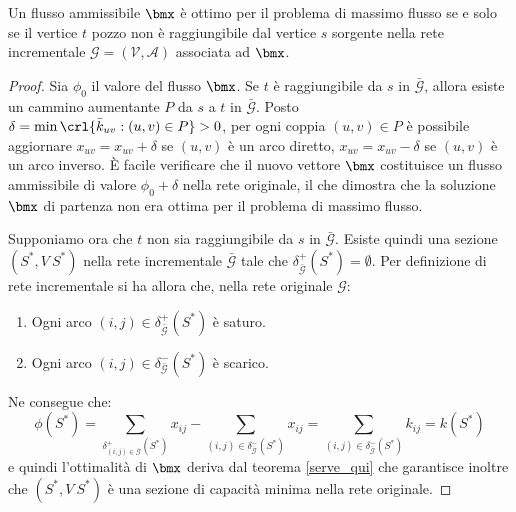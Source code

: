 \documentclass[\main/main.tex]{subfiles}
\begin{document}
\begin{theorem}
  Un flusso ammissibile $\bmx$ è ottimo per il problema di massimo flusso se e solo se il vertice $t$ pozzo non è raggiungibile dal vertice $s$ sorgente nella rete incrementale $\mathcal{G} = (\mathcal{V}, \mathcal{A})$ associata ad $\bmx$.
\end{theorem}

\begin{proof}
  Sia $\phi_0$ il valore del flusso $\bmx$. Se $t$ è raggiungibile da $s$ in $\bar{\mathcal{G}}$, allora esiste un cammino aumentante $P$ da $s$ a $t$ in $\bar{\mathcal{G}}$. Posto $\delta = \min\crl{\bar{k}_{uv}:(u,v) \in P}>0$, per ogni coppia $(u,v) \in P$ è possibile aggiornare $x_{uv}=x_{uv}+\delta$ se $(u,v)$ è un arco diretto, $x_{uv}=x_{uv}-\delta$ se $(u,v)$ è un arco inverso. È facile verificare che il nuovo vettore $\bmx$ costituisce un flusso ammissibile di valore $\phi_0 + \delta$ nella rete originale, il che dimostra che la soluzione $\bmx$ di partenza non era ottima per il problema di massimo flusso.

  Supponiamo ora che $t$ non sia raggiungibile da $s$ in $\bar{\mathcal{G}}$. Esiste quindi una sezione $(S^*,V\ S^*)$ nella rete incrementale $\bar{\mathcal{G}}$ tale che $\delta_{\bar{\mathcal{G}}}^{+}(S^*) = \emptyset$. Per definizione di rete incrementale si ha allora che, nella rete originale $\mathcal{G}$:
  \begin{enumerate}
    \item Ogni arco $(i,j) \in \delta_{\bar{\mathcal{G}}}^{+}(S^*)$ è saturo.
    \item Ogni arco $(i,j) \in \delta_{\bar{\mathcal{G}}}^{-}(S^*)$ è scarico.
  \end{enumerate}
  Ne consegue che:
  \[
    \phi(S^*) = \sum_{\delta_{(i,j) \in \bar{\mathcal{G}}}^{+}(S^*)} x_{ij} - \sum_{(i,j) \in \delta_{\bar{\mathcal{G}}}^{-}(S^*)} x_{ij} = \sum_{(i,j) \in \delta_{\bar{\mathcal{G}}}^{-}(S^*)} k_{ij} = k(S^*)
  \]
  e quindi l'ottimalità di $\bmx$ deriva dal teorema \ref{serve_qui} che garantisce inoltre che $(S^*, V\ S^*)$ è una sezione di capacità minima nella rete originale.
\end{proof}
\end{document}
